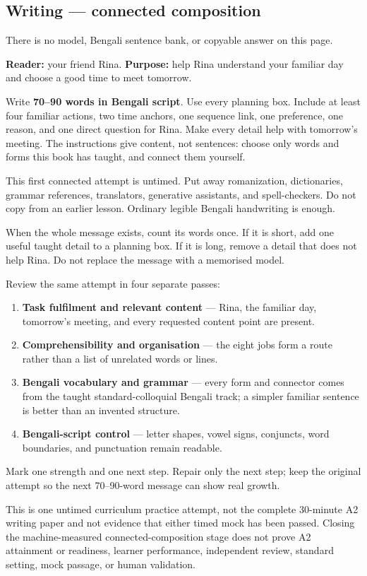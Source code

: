\subsection*{Writing — connected composition}
There is no model, Bengali sentence bank, or copyable answer on this page.

\textbf{Reader:} your friend Rina. \textbf{Purpose:} help Rina understand your familiar day and choose a good time to meet tomorrow.

Write \textbf{70–90 words in Bengali script}. Use every planning box. Include at least four familiar actions, two time anchors, one sequence link, one preference, one reason, and one direct question for Rina. Make every detail help with tomorrow's meeting. The instructions give content, not sentences: choose only words and forms this book has taught, and connect them yourself.

This first connected attempt is untimed. Put away romanization, dictionaries, grammar references, translators, generative assistants, and spell-checkers. Do not copy from an earlier lesson. Ordinary legible Bengali handwriting is enough.

When the whole message exists, count its words once. If it is short, add one useful taught detail to a planning box. If it is long, remove a detail that does not help Rina. Do not replace the message with a memorised model.

\begin{tcolorbox}[breakable,colback=teal!4,colframe=teal!35!black,title={Before you move on}]
Review the same attempt in four separate passes:

\begin{enumerate}
\raggedright
  \item \textbf{Task fulfilment and relevant content} — Rina, the familiar day, tomorrow's meeting, and every requested content point are present.
  \item \textbf{Comprehensibility and organisation} — the eight jobs form a route rather than a list of unrelated words or lines.
  \item \textbf{Bengali vocabulary and grammar} — every form and connector comes from the taught standard-colloquial Bengali track; a simpler familiar sentence is better than an invented structure.
  \item \textbf{Bengali-script control} — letter shapes, vowel signs, conjuncts, word boundaries, and punctuation remain readable.
\end{enumerate}

Mark one strength and one next step. Repair only the next step; keep the original attempt so the next 70–90-word message can show real growth.

This is one untimed curriculum practice attempt, not the complete 30-minute A2 writing paper and not evidence that either timed mock has been passed. Closing the machine-measured connected-composition stage does not prove A2 attainment or readiness, learner performance, independent review, standard setting, mock passage, or human validation.
\end{tcolorbox}
